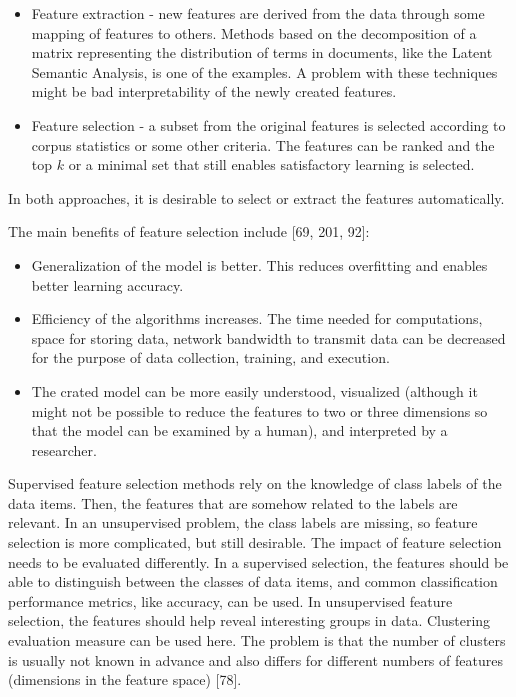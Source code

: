 \documentclass[10pt]{book}
\begin{document}
\begin{itemize}
  \item Feature extraction - new features are derived from the data through some mapping of features to others. Methods based on the decomposition of a matrix representing the distribution of terms in documents, like the Latent Semantic Analysis, is one of the examples. A problem with these techniques might be bad interpretability of the newly created features.
  \item Feature selection - a subset from the original features is selected according to corpus statistics or some other criteria. The features can be ranked and the top $k$ or a minimal set that still enables satisfactory learning is selected.
\end{itemize}

In both approaches, it is desirable to select or extract the features automatically.

The main benefits of feature selection include [69, 201, 92]:

\begin{itemize}
  \item Generalization of the model is better. This reduces overfitting and enables better learning accuracy.
  \item Efficiency of the algorithms increases. The time needed for computations, space for storing data, network bandwidth to transmit data can be decreased for the purpose of data collection, training, and execution.
  \item The crated model can be more easily understood, visualized (although it might not be possible to reduce the features to two or three dimensions so that the model can be examined by a human), and interpreted by a researcher.
\end{itemize}

Supervised feature selection methods rely on the knowledge of class labels of the data items. Then, the features that are somehow related to the labels are relevant. In an unsupervised problem, the class labels are missing, so feature selection is more complicated, but still desirable. The impact of feature selection needs to be evaluated differently. In a supervised selection, the features should be able to distinguish between the classes of data items, and common classification performance metrics, like accuracy, can be used. In unsupervised feature selection, the features should help reveal interesting groups in data. Clustering evaluation measure can be used here. The problem is that the number of clusters is usually not known in advance and also differs for different numbers of features (dimensions in the feature space) [78].
\end{document}
